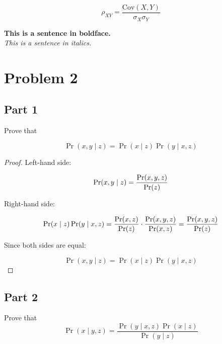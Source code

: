 \documentclass[12pt]{report}
\begin{document}
\begin{equation}
\rho_{XY} = \frac{\text{Cov}(X,Y)}{\sigma_X \sigma_Y}
\end{equation}


\textbf{This is a sentence in boldface.} \\
\textit{This is a sentence in italics.}


\section*{Problem 2}

\subsection*{Part 1}
Prove that

\begin{equation}
\Pr(x, y \mid z) = \Pr(x \mid z) \Pr(y \mid x, z)
\end{equation}


\begin{proof}

Left-hand side:

\begin{equation*}
\Pr(x, y \mid z) = \frac{\Pr(x, y, z)}{\Pr(z)} \nonumber \\[10pt]    
\end{equation*}

Right-hand side:

\begin{equation*}
\Pr(x \mid z) \Pr(y \mid x, z) = \frac{\Pr(x, z)}{\Pr(z)} \cdot \frac{\Pr(x, y, z)}{\Pr(x, z)} \nonumber \\[10pt]
= \frac{\Pr(x, y, z)}{\Pr(z)} \nonumber \\[10pt]
\end{equation*}

Since both sides are equal:

\begin{equation*}
\Pr(x, y \mid z) = \Pr(x \mid z) \Pr(y \mid x, z)
\end{equation*}

\end{proof}

\subsection*{Part 2}
Prove that
\begin{equation}
\Pr(x \mid  y, z) = \frac{\Pr(y \mid x, z) \Pr(x \mid z)}{\Pr(y \mid z)}
\end{equation}
\end{document}
